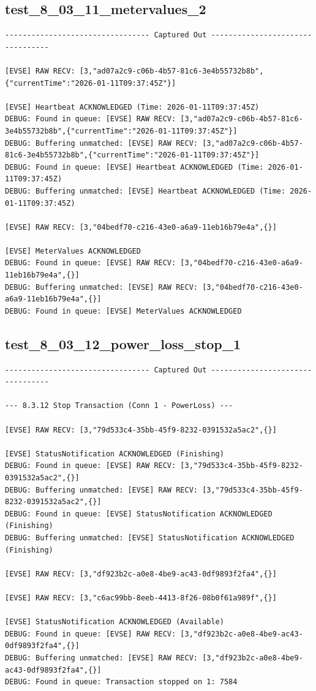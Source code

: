 \documentclass{article}
\begin{document}
\subsection*{test\_8\_03\_11\_metervalues\_2}
\begin{lstlisting}
--------------------------------- Captured Out ---------------------------------

[EVSE] RAW RECV: [3,"ad07a2c9-c06b-4b57-81c6-3e4b55732b8b",{"currentTime":"2026-01-11T09:37:45Z"}]

[EVSE] Heartbeat ACKNOWLEDGED (Time: 2026-01-11T09:37:45Z)
DEBUG: Found in queue: [EVSE] RAW RECV: [3,"ad07a2c9-c06b-4b57-81c6-3e4b55732b8b",{"currentTime":"2026-01-11T09:37:45Z"}]
DEBUG: Buffering unmatched: [EVSE] RAW RECV: [3,"ad07a2c9-c06b-4b57-81c6-3e4b55732b8b",{"currentTime":"2026-01-11T09:37:45Z"}]
DEBUG: Found in queue: [EVSE] Heartbeat ACKNOWLEDGED (Time: 2026-01-11T09:37:45Z)
DEBUG: Buffering unmatched: [EVSE] Heartbeat ACKNOWLEDGED (Time: 2026-01-11T09:37:45Z)

[EVSE] RAW RECV: [3,"04bedf70-c216-43e0-a6a9-11eb16b79e4a",{}]

[EVSE] MeterValues ACKNOWLEDGED
DEBUG: Found in queue: [EVSE] RAW RECV: [3,"04bedf70-c216-43e0-a6a9-11eb16b79e4a",{}]
DEBUG: Buffering unmatched: [EVSE] RAW RECV: [3,"04bedf70-c216-43e0-a6a9-11eb16b79e4a",{}]
DEBUG: Found in queue: [EVSE] MeterValues ACKNOWLEDGED
\end{lstlisting}
\subsection*{test\_8\_03\_12\_power\_loss\_stop\_1}
\begin{lstlisting}
--------------------------------- Captured Out ---------------------------------

--- 8.3.12 Stop Transaction (Conn 1 - PowerLoss) ---

[EVSE] RAW RECV: [3,"79d533c4-35bb-45f9-8232-0391532a5ac2",{}]

[EVSE] StatusNotification ACKNOWLEDGED (Finishing)
DEBUG: Found in queue: [EVSE] RAW RECV: [3,"79d533c4-35bb-45f9-8232-0391532a5ac2",{}]
DEBUG: Buffering unmatched: [EVSE] RAW RECV: [3,"79d533c4-35bb-45f9-8232-0391532a5ac2",{}]
DEBUG: Found in queue: [EVSE] StatusNotification ACKNOWLEDGED (Finishing)
DEBUG: Buffering unmatched: [EVSE] StatusNotification ACKNOWLEDGED (Finishing)

[EVSE] RAW RECV: [3,"df923b2c-a0e8-4be9-ac43-0df9893f2fa4",{}]

[EVSE] RAW RECV: [3,"c6ac99bb-8eeb-4413-8f26-08b0f61a989f",{}]

[EVSE] StatusNotification ACKNOWLEDGED (Available)
DEBUG: Found in queue: [EVSE] RAW RECV: [3,"df923b2c-a0e8-4be9-ac43-0df9893f2fa4",{}]
DEBUG: Buffering unmatched: [EVSE] RAW RECV: [3,"df923b2c-a0e8-4be9-ac43-0df9893f2fa4",{}]
DEBUG: Found in queue: Transaction stopped on 1: 7584
\end{lstlisting}
\end{document}
